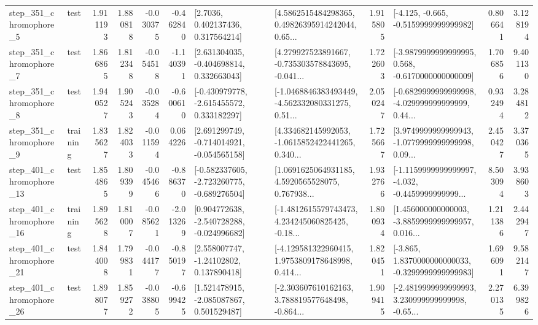 \begin{tabular}{llrrrrllrlrr}
   step\_351\_chromophore\_5 &      test &      1.911193 &    1.880818 &     -0.030375 & -0.462840 &          [2.7036, 0.402137436, 0.317564214] &  [4.5862515484298365, 0.49826395914242044, 0.65... &       1.915805 &              [-4.125, -0.665, -0.5159999999999982] &            0.806641 &          3.128194 \\
   step\_351\_chromophore\_7 &      test &      1.866865 &    1.812348 &     -0.054518 & -1.140391 &    [2.631304035, -0.404698814, 0.332663043] &  [4.279927523891667, -0.735303578843695, -0.041... &       1.722603 &  [-3.9879999999999995, 0.568, -0.6170000000000009] &            1.706856 &          9.401130 \\
   step\_351\_chromophore\_8 &      test &      1.940527 &    1.905243 &     -0.035284 & -0.600610 &   [-0.430979778, -2.615455572, 0.333182297] &  [-1.0468846383493449, -4.562332080331275, 0.51... &       2.050247 &  [-0.6829999999999998, -4.029999999999999, 0.44... &            0.932494 &          3.284812 \\
   step\_351\_chromophore\_9 &  training &      1.835627 &    1.824033 &     -0.011594 &  0.064226 &   [2.691299749, -0.714014921, -0.054565158] &  [4.334682145992053, -1.0615852422441265, 0.340... &       1.725667 &  [3.9749999999999943, -1.0779999999999998, 0.09... &            2.450427 &          3.370365 \\
  step\_401\_chromophore\_13 &      test &      1.854865 &    1.809399 &     -0.045466 & -0.886370 &  [-0.582337605, -2.723260775, -0.689276504] &  [1.0691625064931185, 4.5920565528075, 0.767938... &       1.932766 &  [-1.1159999999999997, -4.032, -0.4459999999999... &            8.503094 &          3.938603 \\
  step\_401\_chromophore\_16 &  training &      1.895628 &    1.810007 &     -0.085621 & -2.013269 &   [0.904772638, -2.540728288, -0.024996682] &  [-1.4812615579743473, 4.234245060825425, -0.18... &       1.800934 &  [1.456000000000003, -3.8859999999999957, 0.016... &            1.211386 &          2.442947 \\
  step\_401\_chromophore\_21 &      test &      1.844008 &    1.799831 &     -0.044177 & -0.850197 &     [2.558007747, -1.24102802, 0.137890418] &  [-4.129581322960415, 1.9753809178648998, 0.414... &       1.820451 &  [-3.865, 1.8370000000000033, -0.3299999999999983] &            1.696091 &          9.582147 \\
  step\_401\_chromophore\_26 &      test &      1.898077 &    1.859272 &     -0.038805 & -0.699425 &    [1.521478915, -2.085087867, 0.501529487] &  [-2.303607610162163, 3.788819577648498, -0.864... &       1.909415 &  [-2.4819999999999993, 3.230999999999998, -0.65... &            2.270135 &          6.399826 \\

\end{tabular}
